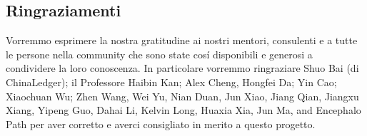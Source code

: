 \documentclass[UTF8,nofonts]{article}
\makeatletter
\newenvironment{figurehere}
 {\def\@captype{figure}}
 {}
\makeatother
\begin{document}
\begin{multicols}{2}
\section{ Ringraziamenti}
Vorremmo esprimere la nostra gratitudine ai nostri mentori, consulenti e a tutte le persone nella community che sono state cos\'i disponibili e generosi a condividere la loro conoscenza. In particolare vorremmo ringraziare Shuo Bai (di ChinaLedger); il Professore Haibin Kan; Alex Cheng, Hongfei Da; Yin Cao; Xiaochuan Wu; Zhen Wang, Wei Yu, Nian Duan, Jun Xiao, Jiang Qian, Jiangxu Xiang, Yipeng Guo, Dahai Li, Kelvin Long, Huaxia Xia, Jun Ma, and Encephalo Path per aver corretto e averci consigliato in merito a questo progetto.


\end{multicols}
\end{document}
